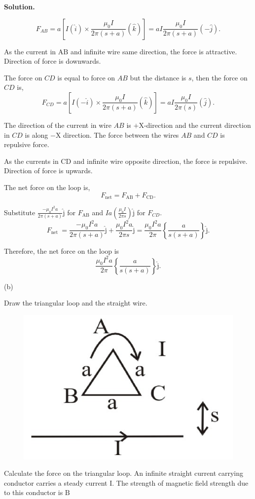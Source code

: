 \documentclass[12pt, a4paper, oneside]{report}
\newenvironment{solution}{
  \par\medskip\noindent
  \textbf{Solution.}\quad\itshape
  \par\noindent\makebox[\linewidth]{\rule{\textwidth}{0.4pt}}
}{
  \par\noindent\makebox[\linewidth]{\rule{\textwidth}{0.4pt}}
  \par\medskip
}
\begin{document}
\begin{solution}
$$
F_{A B}  =a\left[I(\hat{i}) \times \frac{\mu_0 I}{2 \pi(s+a)}(\hat{k})\right] =a I \frac{\mu_0 I}{2 \pi(s+a)}(-\hat{j}).
$$

As the current in $\mathrm{AB}$ and infinite wire same direction, the force is attractive. Direction of force is downwards.

The force on $C D$ is equal to force on $A B$ but the distance is $s$, then the force on $C D$ is,
$$
F_{C D}  =a\left[I(-\hat{i}) \times \frac{\mu_0 I}{2 \pi(s+a)}(\hat{k})\right]  =a I \frac{\mu_0 I}{2 \pi(s)}(\hat{j}).
$$

The direction of the current in wire $A B$ is $+\mathrm{X}$-direction and the current direction in $C D$ is along $-\mathrm{X}$ direction. The force between the wires $A B$ and $C D$ is repulsive force.

As the currents in CD and infinite wire opposite direction, the force is repulsive. Direction of force is upwards.

The net force on the loop is,
$$
F_{\mathrm{net}}=F_{\mathrm{AB}}+F_{\mathrm{CD}}.
$$

Substitute $\frac{-\mu_0 I^2 a}{2 \pi(s+a)} \hat{\mathrm{j}}$ for $F_{\mathrm{AB}}$ and $I a\left(\frac{\mu_0 I}{2 \pi s}\right) \hat{\mathrm{j}}$ for $F_{C D}$.
$$
F_{\text {net }}  =\frac{-\mu_0 I^2 a}{2 \pi(s+a)} \hat{\mathrm{j}}+\frac{\mu_0 I^2 a}{2 \pi s} \hat{\mathrm{j}}  =\frac{\mu_0 I^2 a}{2 \pi}\left\{\frac{a}{s(s+a)}\right\} \hat{\mathrm{j}}.
$$

Therefore, the net force on the loop is
$$
\frac{\mu_0 I^2 a}{2 \pi}\left\{\frac{a}{s(s+a)}\right\} \hat{\mathrm{j}}.
$$

(b)

Draw the triangular loop and the straight wire.

\begin{figure}[ht!]
    \centering
    \includegraphics[width=0.5\linewidth]{8.png}
    \caption{}
    \label{fig:enter-label}
\end{figure}


Calculate the force on the triangular loop.
An infinite straight current carrying conductor carries a steady current $\mathrm{I}$. The strength of magnetic field strength due to this conductor is $\mathrm{B}$


\end{solution}
\end{document}
